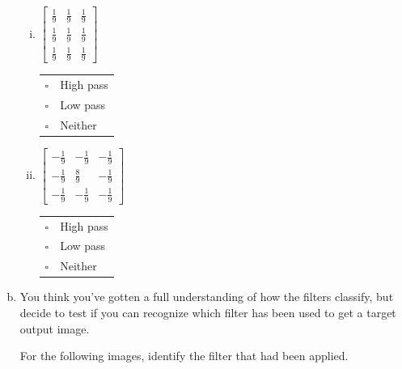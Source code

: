 \begin{enumerate}[(a)]
\begin{enumerate}[(i)]
\item
 $\begin{bmatrix}
    \frac{1}{9} & \frac{1}{9} & \frac{1}{9} \\
    \frac{1}{9} & \frac{1}{9} & \frac{1}{9} \\
    \frac{1}{9} & \frac{1}{9} & \frac{1}{9}
 \end{bmatrix}$
\begin{tabular}[h]{ll}
$\square$ & High pass \\
$\square$ & Low pass \\
$\square$ & Neither \\
\end{tabular}

\item
$\begin{bmatrix}
    -\frac{1}{9} & -\frac{1}{9} & -\frac{1}{9} \\
    -\frac{1}{9} & \frac{8}{9} & -\frac{1}{9} \\
    -\frac{1}{9} & -\frac{1}{9} & -\frac{1}{9}
  \end{bmatrix}$
\begin{tabular}[h]{ll}
$\square$ & High pass \\
$\square$ & Low pass \\
$\square$ & Neither \\
\end{tabular}
\end{enumerate}

\item
You think you've gotten a full understanding of how the filters classify, but decide to test if you can recognize which filter has been used to get a target output image. 

For the following images, identify the filter that had been applied.


\end{enumerate}
